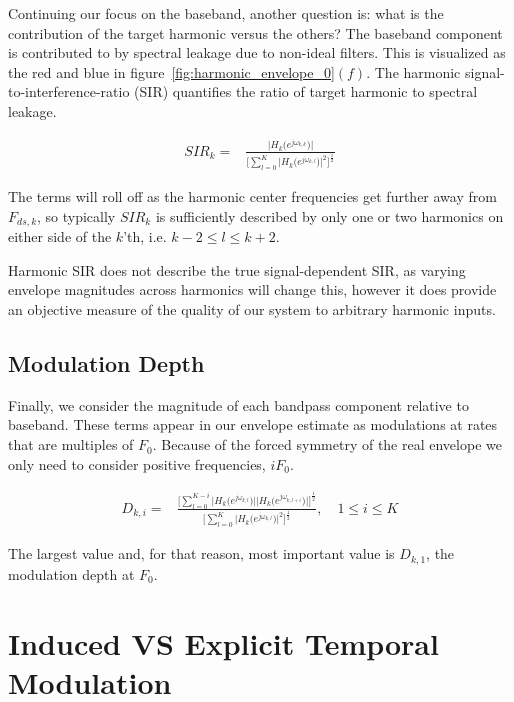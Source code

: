 \documentclass [11pt, proquest,oneside] {ganter_thesis}[2015/03/03]
\begin{document}
Continuing our focus on the baseband, another question is: what is the contribution of the target harmonic versus the others?  The baseband component is contributed to by spectral leakage due to non-ideal filters.  This is visualized as the red and blue in figure~\ref{fig:harmonic_envelope_0}$(f)$.  The harmonic signal-to-interference-ratio (SIR) quantifies the ratio of target harmonic to spectral leakage.

\begin{align}
SIR_k =& \frac{\Big| H_k\big(e^{j\omega_{k,k}}\big) \Big|} {\Bigg[ \sum\limits_{l=0}^K \Big|H_k\big(e^{j\omega_{k,l}}\big)\Big|^2 \Bigg] ^ \frac{1}{2}}
\end{align}

The terms will roll off as the harmonic center frequencies get further away from $F_{ds,k}$, so typically $SIR_k$ is sufficiently described by only one or two harmonics on either side of the $k$'th, i.e. $k-2 \leq l \leq k+2$.

Harmonic SIR does not describe the true signal-dependent SIR, as varying envelope magnitudes across harmonics will change this, however it does provide an objective measure of the quality of our system to arbitrary harmonic inputs.


\subsection{Modulation Depth}

Finally, we consider the magnitude of each bandpass component relative to baseband.  These terms appear in our envelope estimate as modulations at rates that are multiples of $F_0$.  Because of the forced symmetry of the real envelope we only need to consider positive frequencies, $iF_0$.

\begin{align}
D_{k,i} =& \frac{\Bigg[ \sum\limits_{l=0}^{K-i} \Big|H_k\big(e^{j\omega_{k,l}}\big)\Big| \Big|H_k\big(e^{j\omega_{k,l+i}}\big)\Big|\Bigg]^\frac{1}{2}}
{\Bigg[ \sum\limits_{l=0}^K \Big|H_k\big(e^{j\omega_{k,l}}\big)\Big|^2 \Bigg] ^ \frac{1}{2}}, \quad 1 \leq i \leq K
\end{align}

The largest value and, for that reason, most important value is $D_{k,1}$, the modulation depth at $F_0$.

\section{Induced VS Explicit Temporal Modulation}
\end{document}
